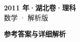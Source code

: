 \documentclass[zihao=-4, a4paper]{ctexart}
\begin{document}
\begin{center}
  {\Large\bfseries 2011 年·湖北卷·理科}\\[4pt]
  {\large 数学 · 解析版}
\end{center}
\medskip
{}

\clearpage
{}
\begin{center}{\Large\bfseries 参考答案与详细解析}\end{center}
\medskip

\end{document}
